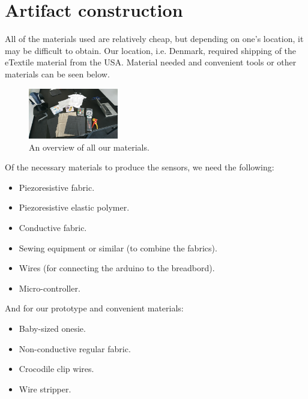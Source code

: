 \documentclass{sigchi-ext}
\begin{document}
\section{Artifact construction}
All of the materials used are relatively cheap, but depending on one's location,
it may be difficult to obtain. Our location, i.e. Denmark, required shipping of
the eTextile material from the USA.
Material needed and convenient tools or other materials can be seen below.
\begin{figure} [H]
  \centering
    \includegraphics[width=0.35\textwidth]{img/materials}
    \caption{An overview of all our materials.}
\end{figure}
Of the necessary materials to produce the sensors, we need the following:
\begin{itemize}
  \item Piezoresistive fabric.
  \item Piezoresistive elastic polymer.
  \item Conductive fabric.
  \item Sewing equipment or similar (to combine the fabrics).
  \item Wires (for connecting the arduino to the breadbord).
  \item Micro-controller.
\end{itemize}

And for our prototype and convenient materials:
\begin{itemize}
  \item Baby-sized onesie.
  \item Non-conductive regular fabric.
  \item Crocodile clip wires.
  \item Wire stripper.
\end{itemize}
\end{document}
